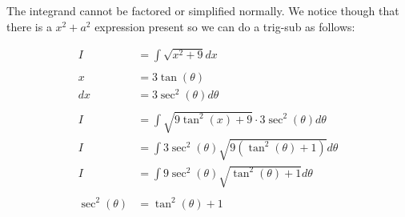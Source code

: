 \documentclass[12pt]{article}
\begin{document}
The integrand cannot be factored or simplified normally.
We notice though that there is a $x^2 + a^2$ expression present so we can do a trig-sub as follows:


\begin{align}
    I                                                & = \int \sqrt{x^2 + 9} dx                                                                                                                          \\
    \nonumber                                                                                                                                                                                            \\
    x                                                & = 3\tan(\theta)                                                                                                                                   \\
    dx                                               & = 3\sec^2(\theta) d\theta                                                                                                                         \\
    \nonumber                                                                                                                                                                                            \\
    I                                                & = \int \sqrt{9\tan^2(x) + 9} \cdot 3\sec^2(\theta) d\theta                                                                                        \\
    I                                                & = \int 3\sec^2(\theta)\sqrt{9(\tan^2(\theta) + 1)} d\theta                                                                                        \\
    I                                                & = \int 9\sec^2(\theta)\sqrt{\tan^2(\theta) + 1} d\theta                                                                                           \\
    \nonumber                                                                                                                                                                                            \\
    \sec^2(\theta)                                   & = \tan^2(\theta) + 1                                                                                                                              \\

\end{align}
\end{document}
